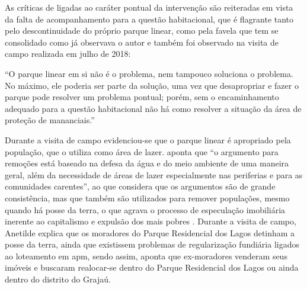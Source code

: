 	As críticas de  ligadas ao caráter pontual da intervenção são reiteradas em vista da falta de acompanhamento para a questão habitacional, que é flagrante tanto pelo descontinuidade do próprio parque linear, como pela favela que tem se consolidado como já observava o autor e também foi observado na visita de campo realizada em julho de 2018:
	
	\begin{citacao}
		``O parque linear em si não é o problema, nem tampouco soluciona o problema. No máximo, ele poderia ser parte da solução, uma vez que desapropriar e fazer o parque pode resolver um problema pontual; porém, sem o encaminhamento adequado para a questão habitacional não há como resolver a situação da área de proteção de mananciais.''
	\end{citacao}
	
	Durante a visita de campo evidenciou-se que o parque linear é apropriado pela população, que o utiliza como área de lazer.  aponta que ``o argumento para remoções está baseado na defesa da água e do meio ambiente de uma maneira geral, além da necessidade de áreas de lazer especialmente nas periferias e para as comunidades carentes'', ao que considera que os argumentos são de grande consistência, mas que também são utilizados para remover populações, mesmo quando há posse da terra, o que agrava o processo de especulação imobiliária inerente ao capitalismo e expulsão dos mais pobres \cite[p.118]{Silva2016}. Durante a visita de campo, Anetilde explica que os moradores do Parque Residencial dos Lagos detinham a posse da terra, ainda que existissem problemas de regularização fundiária ligados ao loteamento em \glsdesc{apm}, sendo assim, aponta que ex-moradores venderam seus imóveis e buscaram realocar-se dentro do Parque Residencial dos Lagos ou ainda dentro do distrito do Grajaú.
	
	
	\postextual
	
	
	
	
	\renewcommand{\glossaryname}{Glossário}
	\renewcommand*{\glsseeformat}[3][\seename]{\textit{#1}
		\glsseelist{#2}}
	
